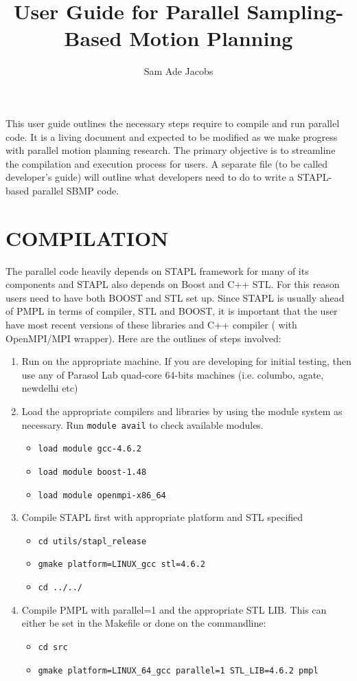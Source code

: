 \documentclass[12pt]{article}
\title{\Large \bf User Guide for Parallel Sampling-Based Motion Planning}
\author{Sam Ade Jacobs}
\begin{document}
\maketitle

This user guide outlines the necessary steps require to compile and run parallel code.
It is a living document and expected to be modified as we make progress with parallel motion planning
research. The primary objective is to streamline the compilation and execution process for users.
A separate file (to be called developer's guide) will outline what developers need to do to write a 
STAPL-based parallel SBMP code. 



\section{COMPILATION}
The parallel code heavily depends on STAPL framework for many of its components and STAPL also depends on
Boost and C++ STL. For this reason users need to have both BOOST and STL set up. Since STAPL is usually
ahead of PMPL in terms of compiler, STL and BOOST, it is important that the user have most recent versions of
these libraries and C++ compiler ( with OpenMPI/MPI wrapper). Here are the outlines of steps involved:
\begin{enumerate}
\item Run on the appropriate machine.  If you are developing for initial testing, then use any of Parasol Lab quad-core 64-bits machines (i.e. columbo, agate, newdelhi etc)
\item Load the appropriate compilers and libraries by using the module system as necessary.  Run {\tt module avail} to check available modules.
  \begin{itemize}
    \item {\tt load module gcc-4.6.2}
    \item {\tt load module boost-1.48}
    \item {\tt load module openmpi-x86\_64}
  \end{itemize}
\item Compile STAPL first with appropriate platform and STL specified
  \begin{itemize}
    \item {\tt cd utils/stapl\_release}
    \item {\tt gmake platform=LINUX\_gcc stl=4.6.2}
    \item {\tt cd ../../}
  \end{itemize}
\item Compile PMPL with parallel=1 and the appropriate STL LIB. This can either be set in the Makefile or done on the commandline:
  \begin{itemize}
    \item {\tt cd src}
    \item {\tt gmake platform=LINUX\_64\_gcc parallel=1 STL\_LIB=4.6.2 pmpl}
  \end{itemize}
\end{enumerate}
\end{document}
